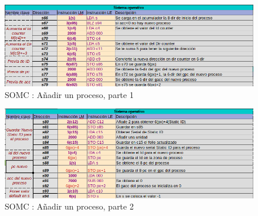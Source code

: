 \documentclass[letterpaper,12pt,oneside]{book}
\begin{document}
		\begin{figure}[h]		
			\centering
			\includegraphics[scale=0.55]{media/CARDIACC/SO_AddNewProcess.png}
			\caption{SOMC : Añadir un proceso, parte 1}
			\label{fig:somcAddnewprocess}
		\end{figure}
		
				\begin{figure}[h]		
			\centering
			\includegraphics[scale=0.55]{media/CARDIACC/SO_AddNewProcess2.png}
			\caption{SOMC : Añadir un proceso, parte 2}
			\label{fig:somcAddnewprocess2}
		\end{figure}
			
\end{document}
